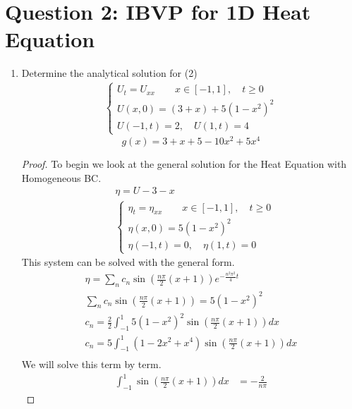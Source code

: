 \documentclass{article}
\begin{document}
\section*{Question 2: IBVP for 1D Heat Equation}

\begin{enumerate}[label=\alph*)]

    \item Determine the analytical solution for (2)
    \begin{align}
        \begin{cases}
            U_t = U_{xx}\quad \quad x \in [-1, 1],
            \quad t \ge 0\\
            U(x,0) = (3+x) + 5(1 - x^2)^2\\
            U(-1,t) = 2, \quad U(1, t) = 4
        \end{cases} 
    \end{align}
    \[
        g(x) =  3 + x + 5 - 10x^2 + 5x^4
    \]
    \begin{proof}
        To begin we look at the general solution for the Heat Equation with
        Homogeneous BC.
        \begin{align*}
            &\eta = U - 3 - x \\
            &\begin{cases}
                \eta_t = \eta_{xx} \quad \quad x \in [-1, 1],
                \quad t \ge 0\\
                \eta(x,0) = 5(1-x^2)^2\\
                \eta(-1,t) = 0, \quad \eta(1, t) = 0
            \end{cases}
        \end{align*}
        This system can be solved with the general form. 
        \begin{align*}
            \eta = \sum_n c_n\sin\left(\frac{n\pi}{2}(x+1)\right)
            e^{-\frac{n^2\pi^2}{4}t}\\
            \sum_n c_n\sin\left(\frac{n\pi}{2}(x+1)\right) = 5(1-x^2)^2\\
            c_n = \frac{2}{2}\int_{-1}^1 5(1-x^2)^2 
            \sin\left(\frac{n\pi}{2}(x+1)\right)dx \\
            c_n = 5\int_{-1}^1 (1 - 2x^2 + x^4)
            \sin\left(\frac{n\pi}{2}(x+1)\right)dx \\
        \end{align*}
        We will solve this term by term. 
        \begin{align*}
            \int_{-1}^1\sin\left(\frac{n\pi}{2}(x+1)\right)dx &= -\frac{2}{n\pi}

\end{align*}
\end{proof}
\end{enumerate}
\end{document}
